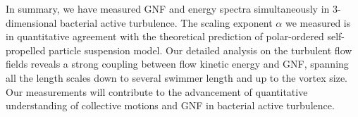 \documentclass[twocolumn,aps,prl,amsmath,amssymb,longbibliography]{revtex4-2}
\begin{document}
In summary, we have measured GNF and energy spectra simultaneously in 3-dimensional bacterial active turbulence. The scaling exponent $\alpha$ we measured is in quantitative agreement with the theoretical prediction of polar-ordered self-propelled particle suspension model.
Our detailed analysis on the turbulent flow fields reveals a strong coupling between flow kinetic energy and GNF, spanning all the length scales down to several swimmer length and up to the vortex size.
Our measurements will contribute to the advancement of quantitative understanding of collective motions and GNF in bacterial active turbulence.



\end{document}
